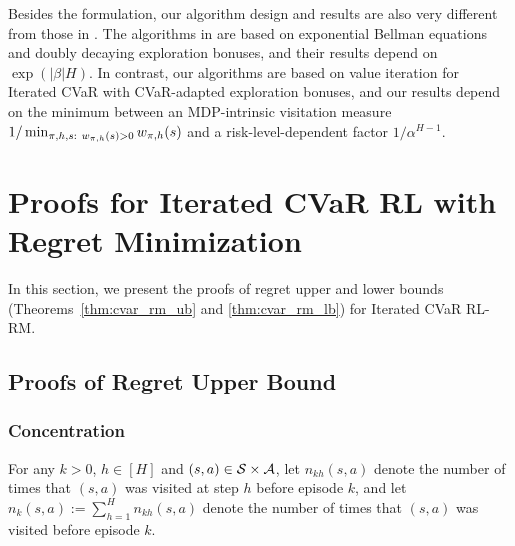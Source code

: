 Besides the formulation, our algorithm design and results are also very different from those in \citep{fei2020near_optimal,fei2021exponential}. The algorithms in \citep{fei2020near_optimal,fei2021exponential} are based on exponential Bellman equations and doubly decaying exploration bonuses, and their results depend on $\exp(|\beta|H)$. In contrast, our algorithms are based on value iteration for Iterated CVaR with CVaR-adapted exploration bonuses, and our results depend on the minimum between an MDP-intrinsic visitation measure $1/\min_{\begin{subarray}{c}\pi,h,s:\  w_{\pi,h}(s)>0\end{subarray}} w_{\pi,h}(s)$ and a risk-level-dependent factor $1/\alpha^{H-1}$.


\section{Proofs for Iterated CVaR RL with Regret Minimization}

In this section, we present the proofs of regret upper and lower bounds (Theorems~\ref{thm:cvar_rm_ub} and \ref{thm:cvar_rm_lb}) for Iterated CVaR RL-RM.

\subsection{Proofs of Regret Upper Bound} \label{apx:regret_ub}


\subsubsection{Concentration}

For any $k>0$, $h \in [H]$ and $(s,a) \in \mathcal{S} \times \mathcal{A}$, let $n_{kh}(s,a)$ denote the number of times that $(s,a)$ was visited at step $h$ before episode $k$, and let $n_{k}(s,a):=\sum_{h=1}^{H} n_{kh}(s,a)$ denote the number of times that $(s,a)$ was visited before episode $k$.

